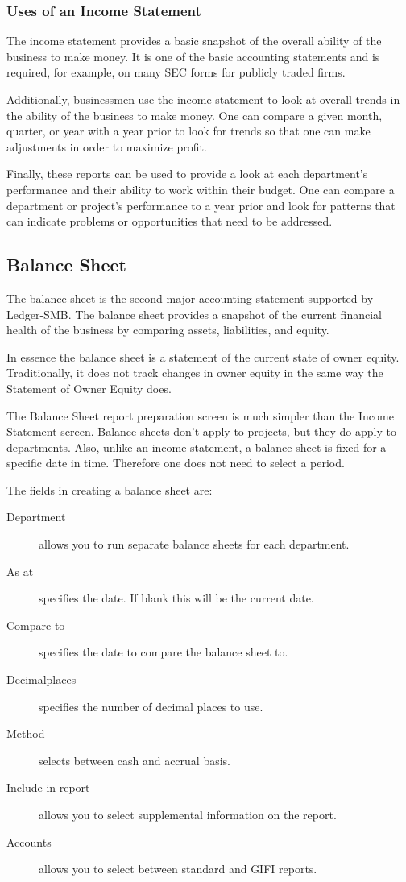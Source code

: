 \documentclass{article}
\begin{document}
\subsubsection{Uses of an Income Statement}
The income statement provides a basic snapshot of the overall ability of the
business to make money.  It is one of the basic accounting statements and is
required, for example, on many SEC forms for publicly traded firms.

Additionally, businessmen use the income statement to look at overall trends in
the ability of the business to make money.  One can compare a given month,
quarter, or year with a year prior to look for trends so that one can make
adjustments in order to maximize profit.

Finally, these reports can be used to provide a look at each department's
performance and their ability to work within their budget.  One can compare a
department or project's performance to a year prior and look for patterns that
can indicate problems or opportunities that need to be addressed.

\subsection{Balance Sheet}
The balance sheet is the second major accounting statement supported by
Ledger-SMB.  The balance sheet provides a snapshot of the current financial
health of the business by comparing assets, liabilities, and equity.

In essence the balance sheet is a statement of the current state of owner
equity.  Traditionally, it does not track changes in owner equity in the same
way the Statement of Owner Equity does.

The Balance Sheet report preparation screen is much simpler than the Income
Statement screen.  Balance sheets don't apply to projects, but they do apply to
departments.  Also, unlike an income statement, a balance sheet is fixed for a
specific date in time.  Therefore one does not need to select a period.

The fields in creating a balance sheet are:

\begin{description}
\item[Department] allows you to run separate balance sheets for each department.
\item[As at] specifies the date.  If blank this will be the current date.
\item[Compare to] specifies the date to compare the balance sheet to.
\item[Decimalplaces] specifies the number of decimal places to use.
\item[Method] selects between cash and accrual basis.
\item[Include in report] allows you to select supplemental information on the
report.
\item[Accounts] allows you to select between standard and GIFI reports.
\end{description}
\end{document}
